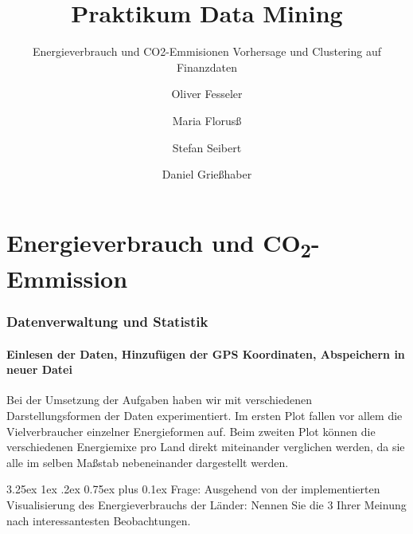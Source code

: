 \documentclass[12pt,a4paper]{scrartcl}
\makeatletter
\renewcommand\subparagraph{\@startsection{subparagraph}{5}{\parindent}%
    {3.25ex \@plus1ex \@minus .2ex}%
    {0.75ex plus 0.1ex}%
    {\normalfont\normalsize\bfseries}}
\makeatother
\begin{document}
\title{Praktikum Data Mining}
\subtitle{Energieverbrauch und CO2-Emmisionen \newline Vorhersage und Clustering auf Finanzdaten}
\author{Oliver Fesseler \and Maria Florus\ss \and Stefan Seibert \and  Daniel Grie\ss haber}
\maketitle
\newpage
\tableofcontents
\newpage

\part*{Energieverbrauch und CO\textsubscript{2}-Emmission}

\section*{Datenverwaltung und Statistik}
\subsection*{Einlesen der Daten, Hinzuf\"ugen der GPS Koordinaten, Abspeichern in neuer Datei}
Bei der Umsetzung der Aufgaben haben wir mit verschiedenen Darstellungsformen der Daten experimentiert. Im ersten Plot fallen vor allem die Vielverbraucher einzelner Energieformen auf. Beim zweiten Plot k\"onnen die verschiedenen Energiemixe pro Land direkt miteinander verglichen werden, da sie alle im selben Ma\ss stab nebeneinander dargestellt werden.

\subparagraph{Frage: Ausgehend von der implementierten Visualisierung des Energieverbrauchs der L\"ander: Nennen Sie die 3 Ihrer Meinung nach interessantesten Beobachtungen.}
\end{document}
